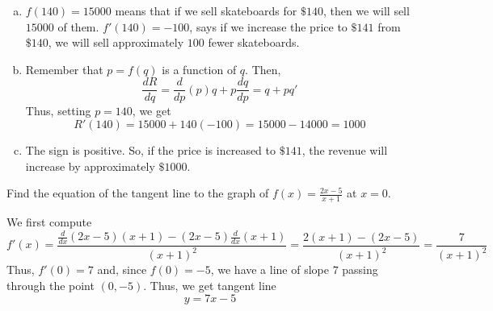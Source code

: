 \documentclass[11pt]{exam}
\newcommand{\ddx}{\frac{d}{dx}}
\begin{document}
\begin{questions}
    \begin{solution}
      \begin{enumerate}[(a)]
      \item \(f(140) = 15000\) means that if we sell skateboards for
        \(\$140\), then we will sell \(15000\) of them. \(f'(140) =
        -100\), says if we increase the price to \(\$141\) from
        \(\$140\), we will sell approximately \(100\) fewer skateboards.
      \item Remember that \(p=f(q)\) is a function of \(q\). Then, \[
          \frac{dR}{dq} = \frac{d}{dp}(p) q + p \frac{dq}{dp} = q+pq'
        \]
        Thus, setting \(p=140\), we get \[
          R'(140) = 15000 + 140(-100) = 15000-14000 = 1000
        \]
      \item The sign is positive. So, if the price is increased to
        \(\$141\), the revenue will increase by approximately \(\$1000\).
      \end{enumerate}
    \end{solution}
  \question Find the equation of the tangent line to the graph of
    \(f(x) = \frac{2x-5}{x+1}\) at \(x=0\).
    \begin{solution}
      We first compute \[
        f'(x) = \frac{\ddx(2x-5)(x+1)-(2x-5)\ddx(x+1)}{(x+1)^2} =
        \frac{2(x+1)-(2x-5)}{(x+1)^2} = \frac{7}{(x+1)^2}
      \]
      Thus, \(f'(0) = 7\) and, since \(f(0)=-5\), we have a line of
      slope \(7\) passing through the point \((0,-5)\). Thus, we get
      tangent line \[
        y = 7x-5
      \]
    \end{solution}
  \question
    \begin{parts}

\end{parts}
\end{questions}
\end{document}
